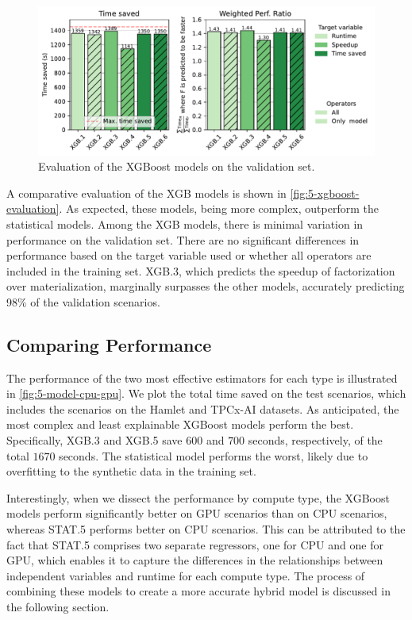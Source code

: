 \begin{figure}[ht]
    \centering
    \includegraphics[width=\linewidth]{chapters/05_cost_estimation/figures/xgb-models-compare.pdf}
    \caption[XGBoost Estimator Comparison]{Evaluation of the XGBoost models on the validation set.}
    \label{fig:5-xgboost-evaluation}
\end{figure}

A comparative evaluation of the XGB models is shown in \autoref{fig:5-xgboost-evaluation}. As expected, these models, being more complex, outperform the statistical models. Among the XGB models, there is minimal variation in performance on the validation set. There are no significant differences in performance based on the target variable used or whether all operators are included in the training set. XGB.3, which predicts the speedup of factorization over materialization, marginally surpasses the other models, accurately predicting 98\% of the validation scenarios.

\subsection{Comparing Performance}
\label{subsec:5-comparing-performance}
The performance of the two most effective estimators for each type is illustrated in \autoref{fig:5-model-cpu-gpu}. We plot the total time saved on the test scenarios, which includes the scenarios on the Hamlet and TPCx-AI datasets. As anticipated, the most complex and least explainable XGBoost models perform the best. Specifically, XGB.3 and XGB.5 save $600$ and $700$ seconds, respectively, of the total $1670$ seconds. The statistical model performs the worst, likely due to overfitting to the synthetic data in the training set.

Interestingly, when we dissect the performance by compute type, the XGBoost models perform significantly better on GPU scenarios than on CPU scenarios, whereas STAT.5 performs better on CPU scenarios. This can be attributed to the fact that STAT.5 comprises two separate regressors, one for CPU and one for GPU, which enables it to capture the differences in the relationships between independent variables and runtime for each compute type. The process of combining these models to create a more accurate hybrid model is discussed in the following section.


